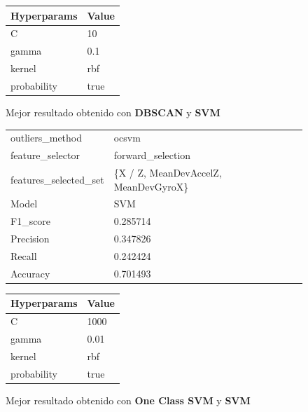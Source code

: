 \begin{appendices}
\begin{figure}[htb]
			\begin{tabular}{ll}
				\toprule
				Hyperparams & Value \\
				\midrule
						  C &    10 \\
					  gamma &   0.1 \\
					 kernel &   rbf \\
				probability &  true \\
				\bottomrule
			\end{tabular}
			\caption{Mejor resultado obtenido con \textbf{DBSCAN} y \textbf{SVM}}
			\label{table:27}
		\end{figure}

		\begin{figure}[htb]
			\centering
			\begin{tabular}{ll}
				\toprule
					  outliers\_method &                                ocsvm \\
					 feature\_selector &                    forward\_selection \\
				features\_selected\_set & \{X / Z, MeanDevAccelZ, MeanDevGyroX\} \\
								Model &                                  SVM \\
						F1\_score &                             0.285714 \\
					   Precision &                             0.347826 \\
						  Recall &                             0.242424 \\
						Accuracy &                             0.701493 \\
				\bottomrule
			\end{tabular}
			\newline
			\newline

			\begin{tabular}{ll}
				\toprule
				Hyperparams & Value \\
				\midrule
						  C &  1000 \\
					  gamma &  0.01 \\
					 kernel &   rbf \\
				probability &  true \\
				\bottomrule
			\end{tabular}
			\caption{Mejor resultado obtenido con \textbf{One Class SVM} y \textbf{SVM}}
			\label{table:28}
		\end{figure}


\end{appendices}
